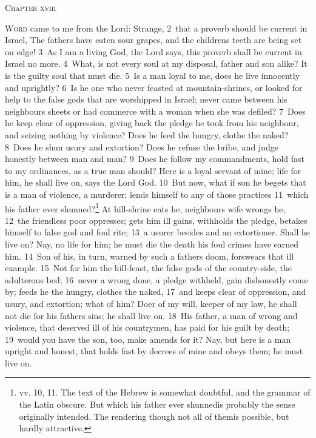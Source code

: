 \documentclass[10pt]{book} %
\begin{document}
\begin{large}\begin{center}\textsc{Chapter xviii}\end{center}\end{large}
\lettrine[lines=2]{W}{ord} came to me from the Lord: Strange, \textcolor{benred8}{2}~that a proverb should be current in Israel, The fathers have eaten sour grapes, and the children\textquotesingle s teeth are being set on edge! \textcolor{benred8}{3}~As I am a living God, the Lord says, this proverb shall be current in Israel no more. \textcolor{benred8}{4}~What, is not every soul at my disposal, father and son alike? It is the guilty soul that must die. \textcolor{benred8}{5}~Is a man loyal to me, does he live innocently and uprightly? \textcolor{benred8}{6}~Is he one who never feasted at mountain-shrines, or looked for help to the false gods that are worshipped in Israel; never came between his neighbour\textquotesingle s sheets or had commerce with a woman when she was defiled? \textcolor{benred8}{7}~Does he keep clear of oppression, giving back the pledge he took from his neighbour, and seizing nothing by violence? Does he feed the hungry, clothe the naked? \textcolor{benred8}{8}~Does he shun usury and extortion? Does he refuse the bribe, and judge honestly between man and man? \textcolor{benred8}{9}~Does he follow my commandments, hold fast to my ordinances, as a true man should? Here is a loyal servant of mine; life for him, he shall live on, says the Lord God.
\textcolor{benred8}{10}~But now, what if son he begets that is a man of violence, a murderer; lends himself to any of those practices \textcolor{benred8}{11}~which his father ever shunned?\footnote[1]{vv. 10, 11. The text of the Hebrew is somewhat doubtful, and the grammar of the Latin obscure. But \textasciigrave which his father ever shunned\textquotesingle  is probably the sense originally intended. The rendering \textasciigrave though not all of them\textquotesingle  is possible, but hardly attractive.} At hill-shrine eats he, neighbour\textquotesingle s wife wrongs he, \textcolor{benred8}{12}~the friendless poor oppresses; gets him ill gains, withholds the pledge, betakes himself to false god and foul rite; \textcolor{benred8}{13}~a usurer besides and an extortioner. Shall he live on? Nay, no life for him; he must die the death his foul crimes have earned him. \textcolor{benred8}{14}~Son of his, in turn, warned by such a father\textquotesingle s doom, forswears that ill example. \textcolor{benred8}{15}~Not for him the hill-feast, the false gods of the country-side, the adulterous bed; \textcolor{benred8}{16}~never a wrong done, a pledge withheld, gain dishonestly come by; feeds he the hungry, clothes the naked, \textcolor{benred8}{17}~and keeps clear of oppression, and usury, and extortion; what of him? Doer of my will, keeper of my law, he shall not die for his father\textquotesingle s sins; he shall live on. \textcolor{benred8}{18}~His father, a man of wrong and violence, that deserved ill of his countrymen, has paid for his guilt by death; \textcolor{benred8}{19}~would you have the son, too, make amends for it? Nay, but here is a man upright and honest, that holds fast by decrees of mine and obeys them; he must live on.
\end{document}
